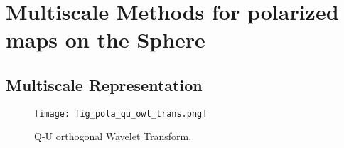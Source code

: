

\chapter{Multiscale Methods for polarized maps on the Sphere}
\label{ch_mms_pola}

\section{Multiscale Representation}

\begin{figure}[htb]
\texttt{[image: fig\_pola\_qu\_owt\_trans.png]}
\caption{Q-U orthogonal Wavelet Transform.}
\label{fig_qu_owt_trans}
\end{figure}

